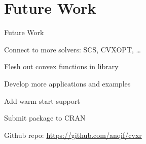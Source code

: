 \documentclass{beamer}
\begin{document}
\section{Future Work}
\begin{frame}{Future Work}
	\BIT
		\item Connect to more solvers: SCS, CVXOPT, \ldots
		\item Flesh out convex functions in library
		\item Develop more applications and examples
		\item Add warm start support
		\item Submit package to CRAN
	\EIT
	
	Github repo: \url{https://github.com/anqif/cvxr}
\end{frame}
\end{document}
